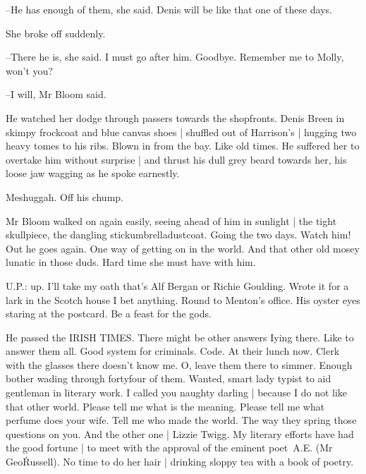 --He has enough of them,
she said.
Denis will be like that one of these days.

She broke off suddenly.

--There he is,
she said.
I must go after him.
Goodbye.
Remember me to Molly,
won't you?

--I will,
Mr Bloom said.

He watched her dodge through passers towards the shopfronts.
Denis Breen in skimpy frockcoat and blue canvas shoes |
shuffled out of Harrison's |
hugging two heavy tomes to his ribs.
Blown in from the bay.
Like old times.
He suffered her to overtake him without surprise |
and thrust his dull grey beard towards her,
his loose jaw wagging as he spoke earnestly.

Meshuggah.
Off his chump.

Mr Bloom walked on again easily,
seeing ahead of him in sunlight |
the tight skullpiece,
the dangling stickumbrelladustcoat.
Going the two days.
Watch him!
Out he goes again.
One way of getting on in the world.
And that other old mosey lunatic in those duds.
Hard time she must have with him.

U.P.:
up.
I'll take my oath that's Alf Bergan or Richie Goulding.
Wrote it for a lark in the Scotch house I bet anything.
Round to Menton's office.
His oyster eyes staring at the postcard.
Be a feast for the gods.

He passed the IRISH TIMES.
There might be other answers Iying there.
Like to answer them all.
Good system for criminals.
Code.
At their lunch now.
Clerk with the glasses there doesn't know me.
O, leave them there to simmer.
Enough bother wading through fortyfour of them.
Wanted,
smart lady typist to aid gentleman in literary work.
I called you naughty darling |
because I do not like that other world.
Please tell me what is the meaning.
Please tell me what perfume does your wife.
Tell me who made the world.
The way they spring those questions on you.
And the other one |
Lizzie Twigg.
My literary efforts have had the good fortune |
to meet with the approval of the eminent poet~A.E.
(Mr Geo\. Russell).
No time to do her hair |
drinking sloppy tea with a book of poetry.

